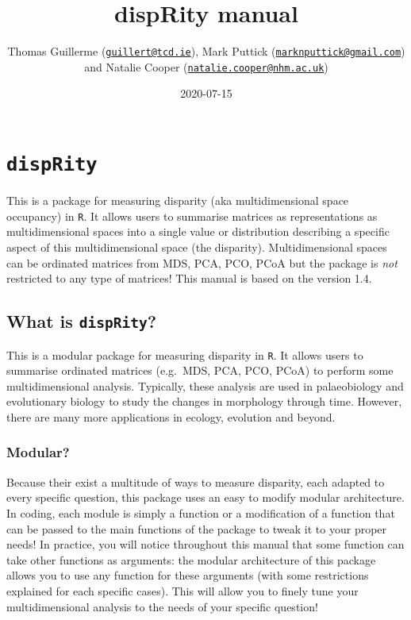 \documentclass[]{book}
\title{dispRity manual}
\author{Thomas Guillerme (\href{mailto:guillert@tcd.ie}{\nolinkurl{guillert@tcd.ie}}),
Mark Puttick (\href{mailto:marknputtick@gmail.com}{\nolinkurl{marknputtick@gmail.com}}) and
Natalie Cooper (\href{mailto:natalie.cooper@nhm.ac.uk}{\nolinkurl{natalie.cooper@nhm.ac.uk}})}
\date{2020-07-15}
\begin{document}
\maketitle

{
\setcounter{tocdepth}{1}
\tableofcontents
}
\hypertarget{disprity}{%
\chapter{\texorpdfstring{\texttt{dispRity}}{dispRity}}\label{disprity}}

This is a package for measuring disparity (aka multidimensional space occupancy) in \texttt{R}.
It allows users to summarise matrices as representations as multidimensional spaces into a single value or distribution describing a specific aspect of this multidimensional space (the disparity).
Multidimensional spaces can be ordinated matrices from MDS, PCA, PCO, PCoA but the package is \emph{not} restricted to any type of matrices!
This manual is based on the version 1.4.

\hypertarget{what-is-disprity}{%
\section{\texorpdfstring{What is \texttt{dispRity}?}{What is dispRity?}}\label{what-is-disprity}}

This is a modular package for measuring disparity in \texttt{R}.
It allows users to summarise ordinated matrices (e.g.~MDS, PCA, PCO, PCoA) to perform some multidimensional analysis.
Typically, these analysis are used in palaeobiology and evolutionary biology to study the changes in morphology through time.
However, there are many more applications in ecology, evolution and beyond.

\hypertarget{modular}{%
\subsection{Modular?}\label{modular}}

Because their exist a multitude of ways to measure disparity, each adapted to every specific question, this package uses an easy to modify modular architecture.
In coding, each module is simply a function or a modification of a function that can be passed to the main functions of the package to tweak it to your proper needs!
In practice, you will notice throughout this manual that some function can take other functions as arguments: the modular architecture of this package allows you to use any function for these arguments (with some restrictions explained for each specific cases).
This will allow you to finely tune your multidimensional analysis to the needs of your specific question!
\end{document}
